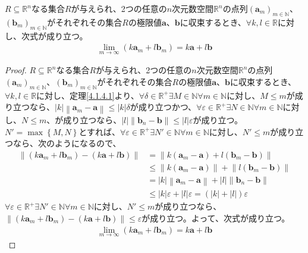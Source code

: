 \documentclass[dvipdfmx]{jsarticle}
\begin{document}
\begin{thm}\label{4.1.4.8}
$R \subseteq \mathbb{R}^{n}$なる集合$R$が与えられ、2つの任意の$n$次元数空間$\mathbb{R}^{n}$の点列$\left( \mathbf{a}_{m} \right)_{m \in \mathbb{N}}$、$\left( \mathbf{b}_{m} \right)_{m \in \mathbb{N}}$がそれぞれその集合$R$の極限値$\mathbf{a}$、$\mathbf{b}$に収束するとき、$\forall k,l \in \mathbb{R}$に対し、次式が成り立つ。
\begin{align*}
\lim_{m \rightarrow \infty}\left( k\mathbf{a}_{m} + l\mathbf{b}_{m} \right) = k\mathbf{a} + l\mathbf{b}
\end{align*}
\end{thm}
\begin{proof}
$R \subseteq \mathbb{R}^{n}$なる集合$R$が与えられ、2つの任意の$n$次元数空間$\mathbb{R}^{n}$の点列$\left( \mathbf{a}_{m} \right)_{m \in \mathbb{N}}$、$\left( \mathbf{b}_{m} \right)_{m \in \mathbb{N}}$がそれぞれその集合$R$の極限値$\mathbf{a}$、$\mathbf{b}$に収束するとき、$\forall k,l \in \mathbb{R}$に対し、定理\ref{4.1.4.1}より、$\forall\delta \in \mathbb{R}^{+}\exists M \in \mathbb{N}\forall m \in \mathbb{N}$に対し、$M \leq m$が成り立つなら、$|k|\left\| \mathbf{a}_{m} - \mathbf{a} \right\| \leq |k|\delta$が成り立つかつ、$\forall\varepsilon \in \mathbb{R}^{+}\exists N \in \mathbb{N}\forall m \in \mathbb{N}$に対し、$N \leq m$、が成り立つなら、$|l|\left\| \mathbf{b}_{n} - \mathbf{b} \right\| \leq |l|\varepsilon$が成り立つ。$N' = \max\left\{ M,N \right\}$とすれば、$\forall\varepsilon \in \mathbb{R}^{+}\exists N' \in \mathbb{N}\forall m \in \mathbb{N}$に対し、$N' \leq m$が成り立つなら、次のようになるので、
\begin{align*}
\left\| \left( k\mathbf{a}_{m} + l\mathbf{b}_{m} \right) - \left( k\mathbf{a} + l\mathbf{b} \right) \right\| &= \left\| k\left( \mathbf{a}_{m} - \mathbf{a} \right) + l\left( \mathbf{b}_{m} - \mathbf{b} \right) \right\|\\
&\leq \left\| k\left( \mathbf{a}_{m} - \mathbf{a} \right) \right\| + \left\| l\left( \mathbf{b}_{m} - \mathbf{b} \right) \right\|\\
&= |k|\left\| \mathbf{a}_{m} - \mathbf{a} \right\| + |l|\left\| \mathbf{b}_{n} - \mathbf{b} \right\|\\
&\leq |k|\varepsilon + |l|\varepsilon = \left( |k| + |l| \right)\varepsilon
\end{align*}
$\forall\varepsilon \in \mathbb{R}^{+}\exists N' \in \mathbb{N}\forall m \in \mathbb{N}$に対し、$N' \leq m$が成り立つなら、$\left\| \left( k\mathbf{a}_{m} + l\mathbf{b}_{m} \right) - \left( k\mathbf{a} + l\mathbf{b} \right) \right\| \leq \varepsilon$が成り立つ。よって、次式が成り立つ。
\begin{align*}
\lim_{m \rightarrow \infty}\left( k\mathbf{a}_{m} + l\mathbf{b}_{m} \right) = k\mathbf{a} + l\mathbf{b}
\end{align*}
\end{proof}
\end{document}
